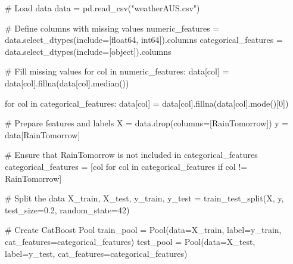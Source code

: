 \documentclass[
  letterpaper,
  DIV=11,
  numbers=noendperiod]{scrartcl}
\newenvironment{Shaded}{\begin{snugshade}}{\end{snugshade}}
\newcommand{\CommentTok}[1]{\textcolor[rgb]{0.37,0.37,0.37}{#1}}
\newcommand{\ControlFlowTok}[1]{\textcolor[rgb]{0.00,0.23,0.31}{#1}}
\newcommand{\DecValTok}[1]{\textcolor[rgb]{0.68,0.00,0.00}{#1}}
\newcommand{\FloatTok}[1]{\textcolor[rgb]{0.68,0.00,0.00}{#1}}
\newcommand{\KeywordTok}[1]{\textcolor[rgb]{0.00,0.23,0.31}{#1}}
\newcommand{\NormalTok}[1]{\textcolor[rgb]{0.00,0.23,0.31}{#1}}
\newcommand{\OperatorTok}[1]{\textcolor[rgb]{0.37,0.37,0.37}{#1}}
\newcommand{\StringTok}[1]{\textcolor[rgb]{0.13,0.47,0.30}{#1}}
\begin{document}
\begin{Shaded}
\begin{Highlighting}[]
\CommentTok{\# Load data}
\NormalTok{data }\OperatorTok{=}\NormalTok{ pd.read\_csv(}\StringTok{"weatherAUS.csv"}\NormalTok{)}

\CommentTok{\# Define columns with missing values}
\NormalTok{numeric\_features }\OperatorTok{=}\NormalTok{ data.select\_dtypes(include}\OperatorTok{=}\NormalTok{[}\StringTok{\textquotesingle{}float64\textquotesingle{}}\NormalTok{, }\StringTok{\textquotesingle{}int64\textquotesingle{}}\NormalTok{]).columns}
\NormalTok{categorical\_features }\OperatorTok{=}\NormalTok{ data.select\_dtypes(include}\OperatorTok{=}\NormalTok{[}\StringTok{\textquotesingle{}object\textquotesingle{}}\NormalTok{]).columns}

\CommentTok{\# Fill missing values}
\ControlFlowTok{for}\NormalTok{ col }\KeywordTok{in}\NormalTok{ numeric\_features:}
\NormalTok{    data[col] }\OperatorTok{=}\NormalTok{ data[col].fillna(data[col].median())}

\ControlFlowTok{for}\NormalTok{ col }\KeywordTok{in}\NormalTok{ categorical\_features:}
\NormalTok{    data[col] }\OperatorTok{=}\NormalTok{ data[col].fillna(data[col].mode()[}\DecValTok{0}\NormalTok{])}

\CommentTok{\# Prepare features and labels}
\NormalTok{X }\OperatorTok{=}\NormalTok{ data.drop(columns}\OperatorTok{=}\NormalTok{[}\StringTok{\textquotesingle{}RainTomorrow\textquotesingle{}}\NormalTok{])}
\NormalTok{y }\OperatorTok{=}\NormalTok{ data[}\StringTok{\textquotesingle{}RainTomorrow\textquotesingle{}}\NormalTok{]}

\CommentTok{\# Ensure that \textquotesingle{}RainTomorrow\textquotesingle{} is not included in categorical\_features}
\NormalTok{categorical\_features }\OperatorTok{=}\NormalTok{ [col }\ControlFlowTok{for}\NormalTok{ col }\KeywordTok{in}\NormalTok{ categorical\_features }\ControlFlowTok{if}\NormalTok{ col }\OperatorTok{!=} \StringTok{\textquotesingle{}RainTomorrow\textquotesingle{}}\NormalTok{]}

\CommentTok{\# Split the data}
\NormalTok{X\_train, X\_test, y\_train, y\_test }\OperatorTok{=}\NormalTok{ train\_test\_split(X, y, test\_size}\OperatorTok{=}\FloatTok{0.2}\NormalTok{, random\_state}\OperatorTok{=}\DecValTok{42}\NormalTok{)}

\CommentTok{\# Create CatBoost Pool}
\NormalTok{train\_pool }\OperatorTok{=}\NormalTok{ Pool(data}\OperatorTok{=}\NormalTok{X\_train, label}\OperatorTok{=}\NormalTok{y\_train, cat\_features}\OperatorTok{=}\NormalTok{categorical\_features)}
\NormalTok{test\_pool }\OperatorTok{=}\NormalTok{ Pool(data}\OperatorTok{=}\NormalTok{X\_test, label}\OperatorTok{=}\NormalTok{y\_test, cat\_features}\OperatorTok{=}\NormalTok{categorical\_features)}


\end{Highlighting}
\end{Shaded}
\end{document}
